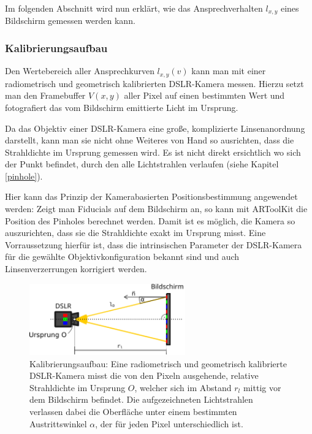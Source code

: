   
  Im folgenden Abschnitt wird nun erklärt, wie das Ansprechverhalten  $l_{x,y}$ eines Bildschirm gemessen werden kann.
 
\subsubsection{Kalibrierungsaufbau}
  
  Den Wertebereich aller Ansprechkurven $l_{x,y}(v)$ kann man mit einer radiometrisch und geometrisch kalibrierten DSLR-Kamera messen.
  Hierzu setzt man den Framebuffer $V(x,y)$ aller Pixel auf einen bestimmten Wert und fotografiert das vom Bildschirm emittierte Licht im Ursprung.

  Da das Objektiv einer DSLR-Kamera eine große, komplizierte Linsenanordnung darstellt, kann man sie nicht ohne Weiteres von Hand so ausrichten, dass die Strahldichte im Ursprung gemessen wird.
    Es ist nicht direkt ersichtlich wo sich der Punkt befindet, durch den alle Lichtstrahlen verlaufen (siehe Kapitel \ref{pinhole}).
  
  Hier kann das Prinzip der Kamerabasierten Positionsbestimmung angewendet werden:
  Zeigt man Fiducials auf dem Bildschirm an, so kann mit ARToolKit die Position des Pinholes berechnet werden.
  Damit ist es möglich, die Kamera so auszurichten, dass sie die Strahldichte exakt im Ursprung misst.
  Eine Vorraussetzung hierfür ist, dass die intrinsischen Parameter der DSLR-Kamera für die gewählte Objektivkonfiguration bekannt sind und auch Linsenverzerrungen korrigiert werden.
  
   \begin{figure}[h]
    \centering
    \includegraphics[width=0.6\textwidth]{../graphics/kalibrierung/radiometric_setup.svg}
    \caption[Aufbau bei der radiometrische Kalibrierung des Bildschirms]{Kalibrierungsaufbau: Eine radiometrisch und geometrisch kalibrierte DSLR-Kamera misst die von den Pixeln ausgehende, relative Strahldichte im Ursprung $O$, welcher sich im Abstand $r_l$ mittig vor dem Bildschirm befindet. 
      Die aufgezeichneten Lichtstrahlen verlassen dabei die Oberfläche unter einem bestimmten Austrittswinkel $\alpha$, der für jeden Pixel unterschiedlich ist.}
    \label{fig:radiometric_setup}
   \end{figure}
 
